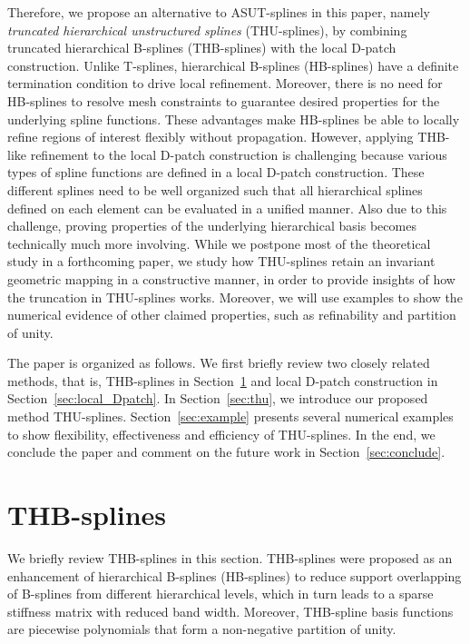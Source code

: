 \documentclass[graybox]{svmult}
\begin{document}
Therefore, we propose an alternative to ASUT-splines in this paper, namely \emph{truncated hierarchical unstructured splines} (THU-splines), by combining truncated hierarchical B-splines (THB-splines) with the local D-patch construction. Unlike T-splines, hierarchical B-splines (HB-splines) have a definite termination condition to drive local refinement. Moreover, there is no need for HB-splines to resolve mesh constraints to guarantee desired properties for the underlying spline functions. These advantages make HB-splines be able to locally refine regions of interest flexibly without propagation. However, applying THB-like refinement to the local D-patch construction is challenging because various types of spline functions are defined in a local D-patch construction. These different splines need to be well organized such that all hierarchical splines defined on each element can be evaluated in a unified manner. Also due to this challenge, proving properties of the underlying hierarchical basis becomes technically much more involving. While we postpone most of the theoretical study in a forthcoming paper, we study how THU-splines retain an invariant geometric mapping in a constructive manner, in order to provide insights of how the truncation in THU-splines works. Moreover, we will use examples to show the numerical evidence of other claimed properties, such as refinability and partition of unity.

The paper is organized as follows. We first briefly review two closely related methods, that is, THB-splines in Section~\ref{sec:thb} and local D-patch construction in Section~\ref{sec:local_Dpatch}. In Section~\ref{sec:thu}, we introduce our proposed method THU-splines. Section~\ref{sec:example} presents several numerical examples to show flexibility, effectiveness and efficiency of THU-splines. In the end, we conclude the paper and comment on the future work in Section~\ref{sec:conclude}.

\section{THB-splines}
\label{sec:thb}

We briefly review THB-splines in this section. THB-splines \cite{ref:giannelli12} were proposed as an enhancement of hierarchical B-splines (HB-splines) \cite{ref:kraft97} to reduce support overlapping of B-splines from different hierarchical levels, which in turn leads to a sparse stiffness matrix with reduced band width. Moreover, THB-spline basis functions are piecewise polynomials that form a non-negative partition of unity.
\end{document}
